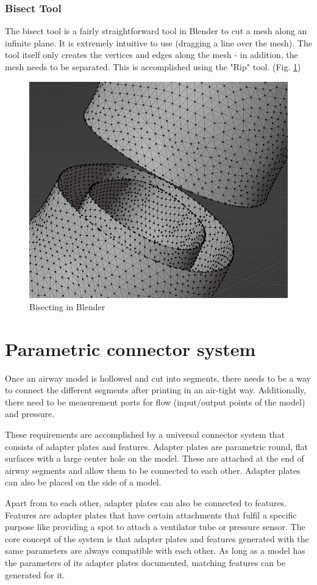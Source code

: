 \documentclass[MME,Projekt,english]{twbook}%
\begin{document}
\subsubsection{Bisect Tool}

The bisect tool is a fairly straightforward tool in Blender to cut a mesh along an infinite plane. It is extremely
intuitive to use (dragging a line over the mesh). The tool itself only creates the vertices and edges along the mesh - in addition, the mesh
needs to be separated. This is accomplished using the "Rip" tool. (Fig. \ref{blender-bisect})

\begin{figure}[!htbp]
	\centering
	\includegraphics[width=.5\linewidth]{images/blender-bisect}
	\caption{Bisecting in Blender}\label{blender-bisect}
\end{figure}

\section{Parametric connector system}

Once an airway model is hollowed and cut into segments, there needs to be a way to connect the different segments after printing
in an air-tight way. Additionally, there need to be measurement ports for flow (input/output points of the model) and pressure.

These requirements are accomplished by a universal connector system that consists of adapter plates and features. Adapter plates
are parametric round, flat surfaces with a large center hole on the model. These are attached at the end of airway segments and
allow them to be connected to each other. Adapter plates can also be placed on the side of a model.

Apart from to each other, adapter plates can also be connected to features. Features are adapter plates that have certain attachments
that fulfil a specific purpose like providing a spot to attach a ventilator tube or pressure sensor. The core concept of the system
is that adapter plates and features generated with the same parameters are always compatible with each other. As long as a model has
the parameters of its adapter plates documented, matching features can be generated for it.
\end{document}
